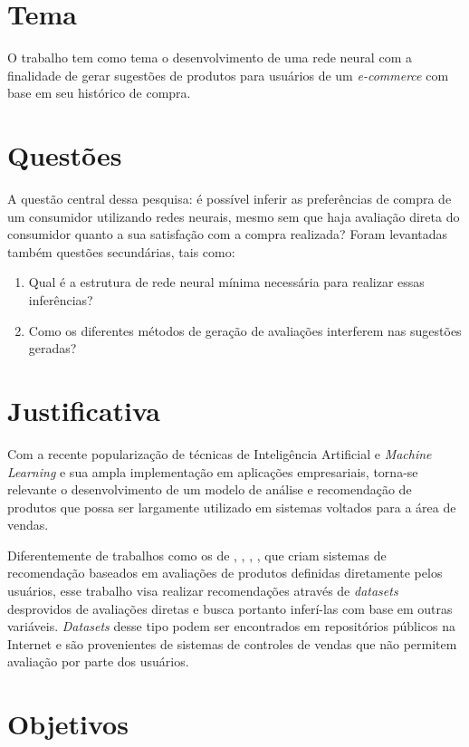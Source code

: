 \section{Tema} \label{tema}
O trabalho tem como tema o desenvolvimento de uma rede neural com a finalidade de gerar sugestões de produtos para usuários de um \textit{e-commerce} com base em seu histórico de compra.

\section{Questões} \label{quest}
A questão central dessa pesquisa: é possível inferir as preferências de compra de um consumidor utilizando redes neurais, mesmo sem que haja avaliação direta do consumidor quanto a sua satisfação com a compra realizada? Foram levantadas também questões secundárias, tais como:
\begin{enumerate}
\item Qual é a estrutura de rede neural mínima necessária para realizar essas inferências?
\item Como os diferentes métodos de geração de avaliações interferem nas sugestões geradas?
\end{enumerate}

\section{Justificativa} \label{justif}
Com a recente popularização de técnicas de Inteligência Artificial e \textit{Machine Learning} e sua ampla implementação em aplicações empresariais, torna-se relevante o desenvolvimento de um modelo de análise e recomendação de produtos que possa ser largamente utilizado em sistemas voltados para a área de vendas.

Diferentemente de trabalhos como os de , , , , que criam sistemas de recomendação baseados em avaliações de produtos definidas diretamente pelos usuários, esse trabalho visa realizar recomendações através de \textit{datasets} desprovidos de avaliações diretas e busca portanto inferí-las com base em outras variáveis. \textit{Datasets} desse tipo podem ser encontrados em repositórios públicos na Internet e são provenientes de sistemas de controles de vendas que não permitem avaliação por parte dos usuários.

\section{Objetivos} \label{objs}

